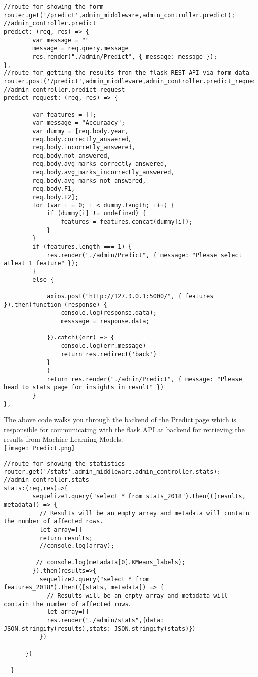 \documentclass[a4paper,12pt,oneside]{book}
\begin{document}
\begin{lstlisting}[caption=Prediction Form]
//route for showing the form
router.get('/predict',admin_middleware,admin_controller.predict);
//admin_controller.predict
predict: (req, res) => {
        var message = ""
        message = req.query.message
        res.render("./admin/Predict", { message: message });
},
//route for getting the results from the flask REST API via form data
router.post('/predict',admin_middleware,admin_controller.predict_request);
//admin_controller.predict_request
predict_request: (req, res) => {

        var features = [];
        var message = "Accuraacy";
        var dummy = [req.body.year,
        req.body.correctly_answered,
        req.body.incorretly_answered,
        req.body.not_answered,
        req.body.avg_marks_correctly_answered,
        req.body.avg_marks_incorrectly_answered,
        req.body.avg_marks_not_answered,
        req.body.F1,
        req.body.F2];
        for (var i = 0; i < dummy.length; i++) {
            if (dummy[i] != undefined) {
                features = features.concat(dummy[i]);
            }
        }
        if (features.length === 1) {
            res.render("./admin/Predict", { message: "Please select atleat 1 feature" });
        }
        else {

            axios.post("http://127.0.0.1:5000/", { features }).then(function (response) {
                console.log(response.data);
                messsage = response.data;
                
            }).catch((err) => {
                console.log(err.message)
                return res.redirect('back')
            }
            )
            return res.render("./admin/Predict", { message: "Please head to stats page for insights in result" })
        }
},
\end{lstlisting}
The above code walks you through the backend of the Predict page which is responsible for communicating with the flask API at backend for retrieving the results from Machine Learning Models.\\
\texttt{[image: Predict.png]}
\begin{lstlisting}[caption= Stats Route]
//route for showing the statistics
router.get('/stats',admin_middleware,admin_controller.stats);
//admin_controller.stats
stats:(req,res)=>{
        sequelize1.query("select * from stats_2018").then(([results, metadata]) => {
          // Results will be an empty array and metadata will contain the number of affected rows.
          let array=[]  
          return results;
          //console.log(array);
          
         // console.log(metadata[0].KMeans_labels);
        }).then(results=>{
          sequelize2.query("select * from features_2018").then(([stats, metadata]) => {
            // Results will be an empty array and metadata will contain the number of affected rows.
            let array=[]  
            res.render("./admin/stats",{data: JSON.stringify(results),stats: JSON.stringify(stats)})
          })
          
      })

  }
\end{lstlisting}
\end{document}
